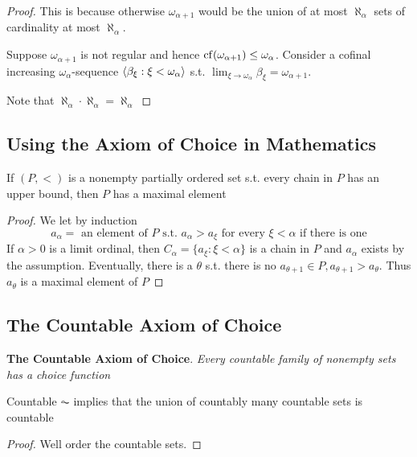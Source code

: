 \documentclass[11pt]{article}
\begin{document}
\begin{proof}
This is because otherwise \(\omega_{\alpha+1}\) would be the union of at most
\(\aleph_\alpha\) sets of cardinality at most \(\aleph_{\alpha}\). 

Suppose \(\omega_{\alpha+1}\) is not regular and hence
\(\operatorname{cf}(\omega_{\alpha+1})\le\omega_{\alpha}\). Consider a cofinal increasing
\(\omega_\alpha\)-sequence \(\langle\beta_\xi:\xi<\omega_\alpha\rangle\) s.t. 
\(\lim_{\xi\to\omega_\alpha}\beta_\xi=\omega_{\alpha+1}\).

Note that \(\aleph_\alpha\cdot\aleph_\alpha=\aleph_\alpha\)
\end{proof}

\subsection{Using the Axiom of Choice in Mathematics}
\label{sec:org8aacf79}
\begin{theorem}
If \((P,<)\) is a nonempty partially ordered set s.t. every chain in \(P\) has an
upper bound, then \(P\) has a maximal element
\end{theorem}

\begin{proof}
We let by induction
\begin{equation*}
a_\alpha=\text{ an element of }P\text{ s.t. }a_\alpha>a_\xi
\text{ for every } \xi<\alpha\text{ if there is one}
\end{equation*}
If \(\alpha>0\) is a limit ordinal, then \(C_\alpha=\{a_\xi:\xi<\alpha\}\) is a
chain in \(P\) and \(a_\alpha\) exists by the assumption. Eventually, there is
a \(\theta\) s.t. there is no \(a_{\theta+1}\in P,a_{\theta+1}>a_{\theta}\). Thus
\(a_\theta\) is a maximal element of \(P\)
\end{proof}

\subsection{The Countable Axiom of Choice}
\label{sec:org302072b}
\textbf{The Countable Axiom of Choice}. \emph{Every countable family of nonempty sets has a}
\emph{choice function}

\begin{proposition}[]
Countable \(\AC\) implies that the union of countably many
countable sets is countable
\end{proposition}
\begin{proof}
Well order the countable sets.
\end{proof}
\end{document}
